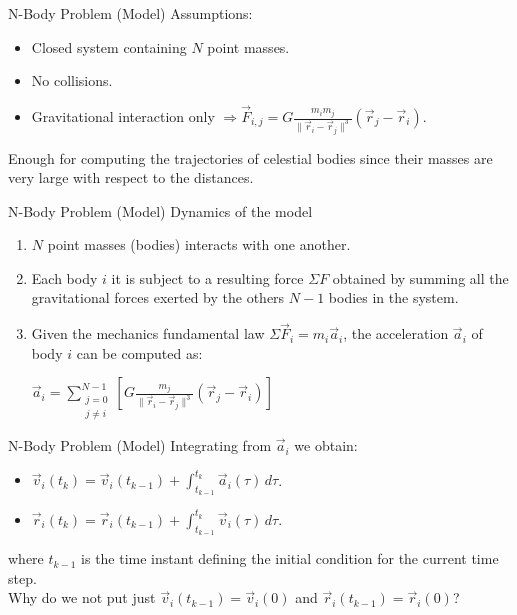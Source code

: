 \documentclass{beamer}
\begin{document}
\begin{frame}{N-Body Problem (Model)}
Assumptions:
\begin{itemize}
	\item Closed system containing $N$ point masses.
	\item No collisions.
	\item Gravitational interaction only $\Rightarrow \vec{F}_{i,j}=G\frac{m_{i} m_{j}}{\|\vec{r}_{i}-\vec{r}_{j}\|^3}(\vec{r}_{j}-\vec{r}_{i})$.
\end{itemize}
Enough for computing the trajectories of celestial bodies since their masses are very large with respect to the distances.


\end{frame}

\begin{frame}{N-Body Problem (Model)}
Dynamics of the model
\begin{enumerate}
	\item $N$ point masses (bodies) interacts with one another.
	\item Each body $i$ it is subject to a resulting force $\Sigma F$ obtained by summing all the gravitational forces exerted by the others $N-1$ bodies in the system.
	\item Given the mechanics fundamental law $\Sigma\vec{F}_i = m_i\vec{a}_i$, the acceleration $\vec{a}_i$ of body $i$ can be computed as:
	\begin{center}
	$\vec{a}_i=\sum_{\substack{j=0 \\ j \neq i}}^{N-1}\left[G\frac{m_j}{\|\vec{r}_i-\vec{r}_j\|^3}(\vec{r}_j-\vec{r}_i)\right]$
	\end{center}  
\end{enumerate}
\end{frame}

\begin{frame}{N-Body Problem (Model)}
Integrating from $\vec{a}_i$ we obtain: 
\begin{itemize}
	\item $\vec{v}_i(t_k) = \vec{v}_i(t_{k-1}) + \int_{t_{k-1}}^{t_k} \vec{a}_i(\tau)\, d\tau$.
	\item $\vec{r}_i(t_k) = \vec{r}_i(t_{k-1}) + \int_{t_{k-1}}^{t_k} \vec{v}_i(\tau)\, d\tau$.  
\end{itemize}
where $t_{k-1}$ is the time instant defining the initial condition for the current time step.
\\
Why do we not put just $\vec{v}_i(t_{k-1}) = \vec{v}_i(0)$ and $\vec{r}_i(t_{k-1}) = \vec{r}_i(0)$?
\end{frame}
\end{document}
